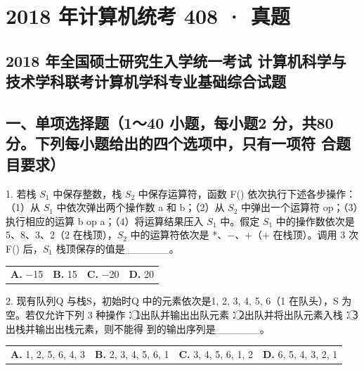 \documentclass[UTF8,11pt]{ctexart}
\begin{document}
\section*{2018 年计算机统考 408 · 真题}
\subsection*{2018 年全国硕士研究生入学统一考试 计算机科学与技术学科联考计算机学科专业基础综合试题}

\subsection*{一、单项选择题（1～40 小题，每小题2 分，共80 分。下列每小题给出的四个选项中，只有一项符 合题目要求）}

1. 若栈 \(\displaystyle S_1\) 中保存整数，栈 \(\displaystyle S_2\) 中保存运算符，函数 F() 依次执行下述各步操作：（1）从 \(\displaystyle S_1\) 中依次弹出两个操作数 a 和 b；（2）从 \(\displaystyle S_2\) 中弹出一个运算符 op；（3）执行相应的运算 b op a；（4）将运算结果压入 \(\displaystyle S_1\) 中。假定 \(\displaystyle S_1\) 中的操作数依次是 5、8、3、2（2 在栈顶），\(\displaystyle S_2\) 中的运算符依次是 *、−、+（+ 在栈顶）。调用 3 次 F() 后，\(\displaystyle S_1\) 栈顶保存的值是\_\_\_\_\_\_。


\begin{center}\begin{tabular}{>{\raggedright\arraybackslash}p{\dimexpr(\linewidth-8\tabcolsep)/4\relax}>{\raggedright\arraybackslash}p{\dimexpr(\linewidth-8\tabcolsep)/4\relax}>{\raggedright\arraybackslash}p{\dimexpr(\linewidth-8\tabcolsep)/4\relax}>{\raggedright\arraybackslash}p{\dimexpr(\linewidth-8\tabcolsep)/4\relax}}
\textbf{A.} −15 & \textbf{B.} 15 & \textbf{C.} −20 & \textbf{D.} 20\\[.35em]\end{tabular}\end{center}

2. 现有队列Q 与栈S，初始时Q 中的元素依次是1, 2, 3, 4, 5, 6（1 在队头），S 为空。若仅允许下列 3 种操作：\textcircled{1}出队并输出出队元素：\textcircled{2}出队并将出队元素入栈：\textcircled{3}出栈并输出出栈元素，则不能得 到的输出序列是\_\_\_\_\_\_。


\begin{center}\begin{tabular}{>{\raggedright\arraybackslash}p{\dimexpr(\linewidth-8\tabcolsep)/4\relax}>{\raggedright\arraybackslash}p{\dimexpr(\linewidth-8\tabcolsep)/4\relax}>{\raggedright\arraybackslash}p{\dimexpr(\linewidth-8\tabcolsep)/4\relax}>{\raggedright\arraybackslash}p{\dimexpr(\linewidth-8\tabcolsep)/4\relax}}
\textbf{A.} 1, 2, 5, 6, 4, 3 & \textbf{B.} 2, 3, 4, 5, 6, 1 & \textbf{C.} 3, 4, 5, 6, 1, 2 & \textbf{D.} 6, 5, 4, 3, 2, 1\\[.35em]\end{tabular}\end{center}
\end{document}
